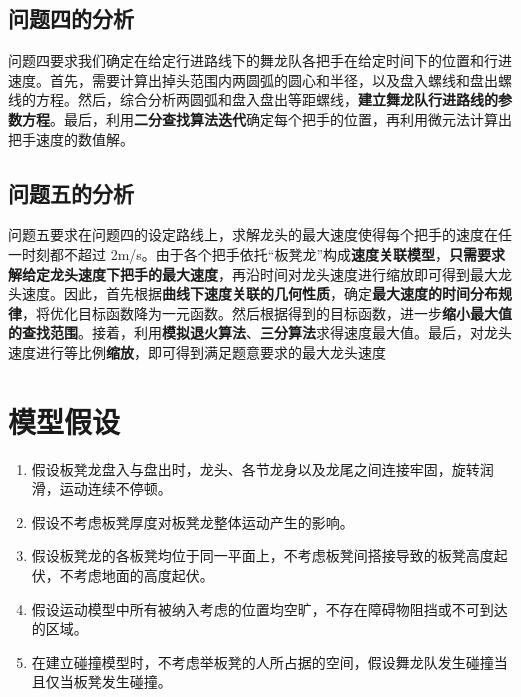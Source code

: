 \documentclass[a4paper]{article}
\begin{document}
	\subsection{问题四的分析}
		问题四要求我们确定在给定行进路线下的舞龙队各把手在给定时间下的位置和行进速度。首先，需要计算出掉头范围内两圆弧的圆心和半径，以及盘入螺线和盘出螺线的方程。然后，综合分析两圆弧和盘入盘出等距螺线，\textbf{建立舞龙队行进路线的参数方程}。最后，利用\textbf{二分查找算法迭代}确定每个把手的位置，再利用微元法计算出把手速度的数值解。
	\subsection{问题五的分析}
		问题五要求在问题四的设定路线上，求解龙头的最大速度使得每个把手的速度在任一时刻都不超过 2m/s。由于各个把手依托“板凳龙”构成\textbf{速度关联模型}，\textbf{只需要求解给定龙头速度下把手的最大速度}，再沿时间对龙头速度进行缩放即可得到最大龙头速度。因此，首先根据\textbf{曲线下速度关联的几何性质}，确定\textbf{最大速度的时间分布规律}，将优化目标函数降为一元函数。然后根据得到的目标函数，进一步\textbf{缩小最大值的查找范围}。接着，利用\textbf{模拟退火算法}、\textbf{三分算法}求得速度最大值。最后，对龙头速度进行等比例\textbf{缩放}，即可得到满足题意要求的最大龙头速度

	\section{模型假设}
	\begin{enumerate}
		\item 假设板凳龙盘入与盘出时，龙头、各节龙身以及龙尾之间连接牢固，旋转润滑，运动连续不停顿。
		\item 假设不考虑板凳厚度对板凳龙整体运动产生的影响。
		\item 假设板凳龙的各板凳均位于同一平面上，不考虑板凳间搭接导致的板凳高度起伏，不考虑地面的高度起伏。
        \item 假设运动模型中所有被纳入考虑的位置均空旷，不存在障碍物阻挡或不可到达的区域。
        \item 在建立碰撞模型时，不考虑举板凳的人所占据的空间，假设舞龙队发生碰撞当且仅当板凳发生碰撞。
	\end{enumerate}

\end{document}
